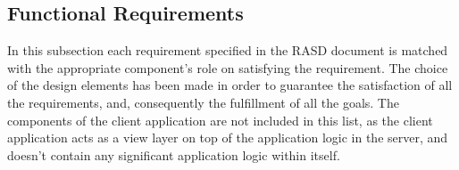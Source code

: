 \subsection{Functional Requirements}
In this subsection each requirement specified in the RASD document is matched with the appropriate component's role on satisfying the requirement.
The choice of the design elements has been made in order to guarantee the satisfaction of all the requirements, and, consequently the fulfillment of all the goals.
The components of the client application are not included in this list, as the client application acts as a view layer on top of the application logic in the server, and doesn't contain any significant application logic within itself.

